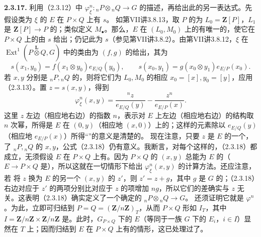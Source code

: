 \textbf{2.3.17.} 利用（2.3.12）中 $\varphi_\xi^n:{}_nP\otimes{}_nQ\longrightarrow G$ 的描述，再给出此的另一表达式。先假设类为 $\xi$ 的 $E$ 在 $P\times Q$ 上有 $s$。
如第VII讲3.8.13，取 $P$ 的为 $L_0=\mathbf Z[P]$，$L_1$ 是 $\mathbf Z[P]\longrightarrow P$ 的；类似定义 $M_\bullet$。那么，$E$ 在 $(L_0,M_0)$ 上的有唯一的，使它在 $P\times Q$ 上的由 $s$ 给出；仍记此为 $s$（参见第VII讲3.8.2）。由第VII讲3.8.12，$\xi$ 在 $\operatorname{Ext}^1(P\mathbin{\overset{\mathbf L}{\otimes}}Q,G)$ 中的类由为 $(f,g)$ 的给出，其为
\[s(x_1,y_0)=f(x_1\otimes y_0)e_{E/Q}(y_0),\qquad
s(x_0,y_1)=g(x_0\otimes y_1)e_{E/P}(x_0).\]
若 $x,y$ 分别是 ${}_nP,{}_nQ$ 的，则将它们为 $L_0,M_0$ 的相应 $x_0=[x],y_0=[y]$，应用（2.3.13）。置 $z=s(x,y)$，得到
\[\varphi_\xi^n(x,y)=\frac{{}^{n}z}{e_{E/Q}(y)}-\frac{z^{n}}{e_{E/P}(x)}.\tag{2.3.18}\]
这里 $z$ 左边（相应地右边）的指数 $n$，表示对 $E$ 上左边（相应地右边）的结构取 $n$ 次幂，所得是 $E$ 在 $(0,y)$（相应地 $(x,0)$）上的；这样的元素除以 $e_{E/Q}(y)$（相应地 $e_{E/P}(x)$）所得“”的意义是清楚的。
现在注意，只要 $z$ 是 $E$ 的一个，了 ${}_nP,{}_nQ$ 的 $x,y$，公式（2.3.18）仍有意义。我断言，对每个这样的，（2.3.18）都成立，无须假设 $E$ 在 $P\times Q$ 上有。因为 $P\times Q$ 的 $(x,y)$ 总能为 $E$ 的（$E\longrightarrow P\times Q$ 是），所以这就在一切情形下给出 $\varphi_\xi^n(x,y)$ 的计算方法。还应注意，若
将 $z$ 换为 $E$ 的另一个 $(x,y)$ 的 $z'$，则 $z'=z+g$，其中 $g$ 是 $G$ 的；（2.3.18）右边对应于 $z'$ 的两项分别比对应于 $z$ 的项增加 $ng$，所以它们的差确实与 $z$ 无关。这表明（2.3.18）确实定义了一个确定的 ${}_nP\otimes{}_nQ\longrightarrow G$。
还须证明它就是 $\varphi^n$。为此，立即可归结到 $P=Q=(\mathbf Z/n\mathbf Z)_T$，从而 $P\times Q$ 形如 $I_T$，其中 $I=\mathbf Z/n\mathbf Z\times\mathbf Z/n\mathbf Z$ 是。此时，$G_{P\times Q}$ 下的 $E$（等同于一族 $G$ 下的 $E_i$，$i\in I$）显然在 $T$ 上；因而归结到 $E$ 在 $P\times Q$ 上有的情形，这已处理过了。


